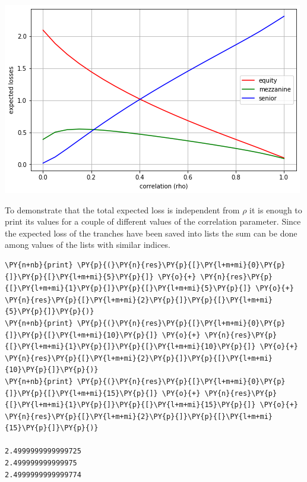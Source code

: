 \begin{Answer}
\includegraphics{figures/losses_vs_rho_2}

To demonstrate that the total expected loss is independent from $\rho$ it is enough to print its values for a couple of different values of the correlation parameter. Since the expected loss of the tranches have been saved into lists the sum can be done among values of the lists with similar indices. 

\begin{tcolorbox}[size=fbox, boxrule=1pt, colback=cellbackground, colframe=cellborder]
\begin{Verbatim}[commandchars=\\\{\}]
\PY{n+nb}{print} \PY{p}{(}\PY{n}{res}\PY{p}{[}\PY{l+m+mi}{0}\PY{p}{]}\PY{p}{[}\PY{l+m+mi}{5}\PY{p}{]} \PY{o}{+} \PY{n}{res}\PY{p}{[}\PY{l+m+mi}{1}\PY{p}{]}\PY{p}{[}\PY{l+m+mi}{5}\PY{p}{]} \PY{o}{+} \PY{n}{res}\PY{p}{[}\PY{l+m+mi}{2}\PY{p}{]}\PY{p}{[}\PY{l+m+mi}{5}\PY{p}{]}\PY{p}{)}
\PY{n+nb}{print} \PY{p}{(}\PY{n}{res}\PY{p}{[}\PY{l+m+mi}{0}\PY{p}{]}\PY{p}{[}\PY{l+m+mi}{10}\PY{p}{]} \PY{o}{+} \PY{n}{res}\PY{p}{[}\PY{l+m+mi}{1}\PY{p}{]}\PY{p}{[}\PY{l+m+mi}{10}\PY{p}{]} \PY{o}{+} \PY{n}{res}\PY{p}{[}\PY{l+m+mi}{2}\PY{p}{]}\PY{p}{[}\PY{l+m+mi}{10}\PY{p}{]}\PY{p}{)}
\PY{n+nb}{print} \PY{p}{(}\PY{n}{res}\PY{p}{[}\PY{l+m+mi}{0}\PY{p}{]}\PY{p}{[}\PY{l+m+mi}{15}\PY{p}{]} \PY{o}{+} \PY{n}{res}\PY{p}{[}\PY{l+m+mi}{1}\PY{p}{]}\PY{p}{[}\PY{l+m+mi}{15}\PY{p}{]} \PY{o}{+} \PY{n}{res}\PY{p}{[}\PY{l+m+mi}{2}\PY{p}{]}\PY{p}{[}\PY{l+m+mi}{15}\PY{p}{]}\PY{p}{)}

2.4999999999999725
2.499999999999975
2.4999999999999774
\end{Verbatim}
\end{tcolorbox}
\end{Answer}

